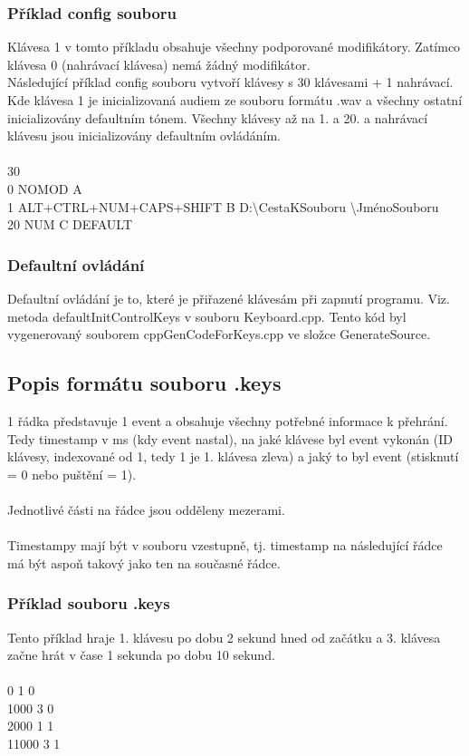 \documentclass[12pt]{article}
\begin{document}
	\newpage
	\subsubsection{Příklad config souboru}
	Klávesa 1 v tomto příkladu obsahuje všechny podporované modifikátory. Zatímco klávesa 0 (nahrávací klávesa) nemá žádný modifikátor.
	\\
	Následující příklad config souboru vytvoří klávesy s 30 klávesami + 1 nahrávací. Kde klávesa 1 je inicializovaná audiem ze souboru formátu .wav a všechny ostatní inicializovány defaultním tónem. Všechny klávesy až na 1. a 20. a nahrávací klávesu jsou inicializovány defaultním ovládáním.
	\\
	\\
	30
	\\
	0 NOMOD A
	\\
	1 ALT+CTRL+NUM+CAPS+SHIFT B D:\textbackslash CestaKSouboru \textbackslash JménoSouboru
	\\
	20 NUM C DEFAULT
	
	\subsubsection{Defaultní ovládání}
	Defaultní ovládání je to, které je přiřazené klávesám při zapnutí programu. Viz. metoda defaultInitControlKeys v souboru Keyboard.cpp. Tento kód byl vygenerovaný souborem cppGenCodeForKeys.cpp ve složce GenerateSource.
	
	\newpage
	\subsection{Popis formátu souboru .keys}
	1 řádka představuje 1 event a obsahuje všechny potřebné informace k přehrání. Tedy timestamp v ms (kdy event nastal), na jaké klávese byl event vykonán (ID klávesy, indexované od 1, tedy 1 je 1. klávesa zleva) a jaký to byl event (stisknutí = 0 nebo puštění = 1).
	\\
	\\
	Jednotlivé části na řádce jsou odděleny mezerami.
	\\
	\\
	Timestampy mají být v souboru vzestupně, tj. timestamp na následující řádce má být aspoň takový jako ten na současné řádce.
	
	\subsubsection{Příklad souboru .keys}
	Tento příklad hraje 1. klávesu po dobu 2 sekund hned od začátku a 3. klávesa začne hrát v čase 1 sekunda po dobu 10 sekund.
	\\
	\\ 
	0 1 0
	\\
	1000 3 0
	\\
	2000 1 1
	\\
	11000 3 1
	
\end{document}
